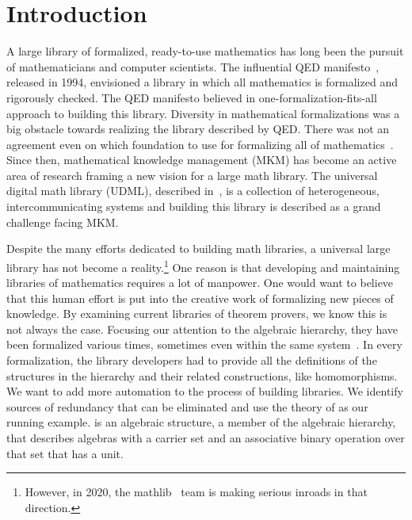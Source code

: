 \chapter{Introduction}
\label{ch:intro}

A large library of formalized, ready-to-use mathematics has long been the pursuit of mathematicians and computer scientists.  
The influential QED manifesto~\citep{boyer1994qed}, released in 1994, envisioned a library in which all mathematics is formalized and rigorously checked. The QED manifesto believed in one-formalization-fits-all approach to building this library.
Diversity in mathematical formalizations was a big obstacle towards realizing the library described by QED. There was not an agreement even on which foundation to use for formalizing all of mathematics~\cite{qedrealoaded2016}.  Since then, mathematical knowledge management (MKM) has become an active area of research framing a new vision for a large math library. The universal digital math library (UDML), described in~\cite{farmer2004mkm}, is a collection of heterogeneous, intercommunicating systems and building this library is described as a grand challenge facing MKM. 

Despite the many efforts dedicated to building math libraries, a universal large library has not become a reality.\footnote{However, in 2020, the mathlib~\cite{lean2019} team is making serious inroads in that direction.} One reason is that developing and maintaining libraries of mathematics requires a lot of manpower. One would want to believe that this human effort is put into the creative work of formalizing new pieces of knowledge. By examining current libraries of theorem provers, we know this is not always the case. Focusing our attention to the algebraic hierarchy, they have been formalized various times, sometimes even within the same system~\cite{Geuvers2002, Gonthier2009, Spitters2010, coq-contribs-algebra}. 
In every formalization, the library developers had to provide all the definitions of the structures in the hierarchy and their related constructions, like homomorphisms. We want to add more automation to the process of building libraries. We identify sources of redundancy that can be eliminated and use the theory of  as our running example.  is an algebraic structure, a member of the algebraic hierarchy, that describes algebras with a carrier set and an associative binary operation over that set that has a unit.

